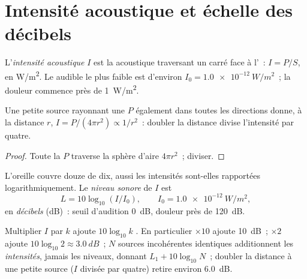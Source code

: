 \section{Intensité acoustique et échelle des décibels}

\begin{definition}\label{def:g12:sound-acoustics:intensity}
L'\emph{intensité acoustique} $I$ est la
 acoustique traversant un  carré face à
l'~: $I = P/S$, en \unit{W/m^2}. Le  audible le plus
faible est d'environ $I_0 = \qty{1.0e-12}{W/m^2}$~; la douleur commence
près de \qty{1}{W/m^2}.
\end{definition}

\begin{proposition}\label{prop:g12:sound-acoustics:inverse-square}
%
Une petite source rayonnant une  $P$ également dans
toutes les directions donne, à la distance $r$,
$I = P/(4\pi r^2) \propto 1/r^2$~: doubler la distance divise
l'intensité par quatre.
\end{proposition}

\begin{proof}
Toute la  $P$ traverse la sphère d'aire $4\pi r^2$~;
diviser.
\end{proof}

\begin{definition}\label{def:g12:sound-acoustics:level}
L'oreille couvre douze  de dix, aussi les intensités
sont-elles rapportées logarithmiquement. Le \emph{niveau
sonore} de $I$ est
\[ L = 10 \log_{10}(I/I_0), \qquad I_0 = \qty{1.0e-12}{W/m^2}, \]
en \emph{décibels} (\unit{dB})~: seuil d'audition
\qty{0}{dB}, douleur près de \qty{120}{dB}.
\end{definition}

\begin{proposition}\label{prop:g12:sound-acoustics:db-arithmetic}
Multiplier $I$ par $k$ ajoute $10\log_{10}k$ . En
particulier $\times 10$ ajoute \qty{10}{dB}~; $\times 2$ ajoute
$10\log_{10}2 \approx \qty{3.0}{dB}$~; $N$ sources incohérentes
identiques additionnent les \emph{intensités}, jamais les niveaux,
donnant $L_1 + 10\log_{10}N$~; doubler la distance à une petite
source ($I$ divisée par quatre) retire environ \qty{6.0}{dB}.
\end{proposition}

